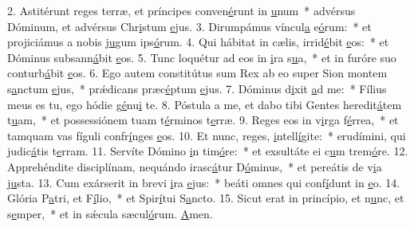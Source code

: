 2. Astitérunt reges terræ, et príncipes conven\uline{é}runt in \uline{u}num~* advérsus Dóminum, et advérsus Chr\uline{i}stum \uline{e}jus.
3. Dirumpámus víncul\uline{a} e\uline{ó}rum:~* et projiciámus a nobis j\uline{u}gum ips\uline{ó}rum.
4. Qui hábitat in cælis, irrid\uline{é}bit \uline{e}os:~* et Dóminus subsann\uline{á}bit \uline{e}os.
5. Tunc loquétur ad eos in \uline{i}ra s\uline{u}a,~* et in furóre suo conturb\uline{á}bit \uline{e}os.
6. Ego autem constitútus sum Rex ab eo super Sion montem s\uline{a}nctum \uline{e}jus,~* prǽdicans præc\uline{é}ptum \uline{e}jus.
7. Dóminus d\uline{i}xit \uline{a}d me:~* Fílius meus es tu, ego hódie g\uline{é}nu\uline{i} te.
8. Póstula a me, et dabo tibi Gentes heredit\uline{á}tem t\uline{u}am,~* et possessiónem tuam t\uline{é}rminos t\uline{e}rræ.
9. Reges eos in v\uline{i}rga f\uline{é}rrea,~* et tamquam vas fíguli confr\uline{í}nges \uline{e}os.
10. Et nunc, reges, \uline{i}ntell\uline{í}gite:~* erudímini, qui judic\uline{á}tis t\uline{e}rram.
11. Servíte Dómino \uline{i}n tim\uline{ó}re:~* et exsultáte ei c\uline{u}m trem\uline{ó}re.
12. Apprehéndite disciplínam, nequándo irasc\uline{á}tur D\uline{ó}minus,~* et pereátis de v\uline{i}a j\uline{u}sta.
13. Cum exárserit in brevi \uline{i}ra \uline{e}jus:~* beáti omnes qui conf\uline{í}dunt in \uline{e}o.
14. Glória P\uline{a}tri, et F\uline{í}lio,~* et Spir\uline{í}tui S\uline{a}ncto.
15. Sicut erat in princípio, et n\uline{u}nc, et s\uline{e}mper,~* et in sǽcula sæcul\uline{ó}rum. \uline{A}men.
